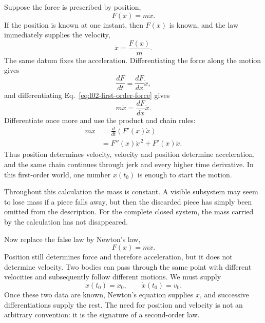 Suppose the force is prescribed by position,
\begin{equation}
 F(x)=m\dot x.
 \label{eq:l02-first-order-force}
\end{equation}
If the position is known at one instant, then \(F(x)\) is known, and the law
immediately supplies the velocity,
\begin{equation}
 \dot x=\frac{F(x)}{m}.
\end{equation}
The same datum fixes the acceleration. Differentiating the force along the
motion gives
\begin{equation}
 \frac{dF}{dt}=\frac{dF}{dx}\dot x,
\end{equation}
and differentiating Eq.~\eqref{eq:l02-first-order-force} gives
\begin{equation}
 m\ddot x=\frac{dF}{dx}\dot x.
 \label{eq:l02-first-acceleration}
\end{equation}
Differentiate once more and use the product and chain rules:
\begin{align}
 m\dddot x
 &=\frac{d}{dt}\left(F'(x)\dot x\right) \\
 &=F''(x)\dot x^{\,2}+F'(x)\ddot x.
 \label{eq:l02-jerk}
\end{align}
Thus position determines velocity, velocity and position determine
acceleration, and the same chain continues through jerk and every higher time
derivative. In this first-order world, one number \(x(t_0)\) is enough to start
the motion.

Throughout this calculation the mass is constant. A visible subsystem may
seem to lose mass if a piece falls away, but then the discarded piece has
simply been omitted from the description. For the complete closed system, the
mass carried by the calculation has not disappeared.

Now replace the false law by Newton's law,
\begin{equation}
 F(x)=m\ddot x.
 \label{eq:l02-newton-one-d}
\end{equation}
Position still determines force and therefore acceleration, but it does not
determine velocity. Two bodies can pass through the same point with different
velocities and subsequently follow different motions. We must supply
\begin{equation}
 x(t_0)=x_0,
 \qquad
 \dot x(t_0)=v_0.
 \label{eq:l02-initial-data}
\end{equation}
Once these two data are known, Newton's equation supplies \(\ddot x\), and
successive differentiations supply the rest. The need for position and
velocity is not an arbitrary convention: it is the signature of a
second-order law.


